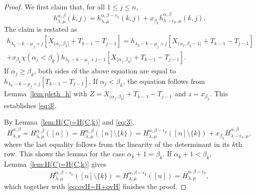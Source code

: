 \documentclass[12pt]{amsart}
\numberwithin{equation}{section}
\theoremstyle{definition}
\newcommand\ovh{\overline{h}}
\newcommand\ovH{\overline{H}}
\begin{document}
\begin{proof}
We first claim that, for all $1\le j\le n$,
  \begin{equation}
    \label{eq:3}
  h_{\lambda,\mu}^{\alpha,\beta}(k,j)
  =h_{\lambda,\mu}^{\alpha,\beta-\epsilon_k}(k,j)
  +x_{\beta_k} \ovh_{\lambda-\epsilon_k,\mu}^{\alpha,\beta}(k,j).
  \end{equation}
  The claim is restated as
  \begin{multline*}
    h_{\lambda_k-k-\mu_j+j}[X_{(\alpha_j,\beta_k]}+T_{k-1}-T_{j-1}]
    =h_{\lambda_k-k-\mu_j+j}[X_{(\alpha_j,\beta_k-1]}+T_{k-1}-T_{j-1}]\\
    +x_{\beta_k} \chi(\alpha_j<\beta_k)
    h_{\lambda_k-k-\mu_j+j-1}[X_{(\alpha_j,\beta_k]}+T_{k-1}-T_{j-1}].
  \end{multline*}
  If $\alpha_j\ge \beta_k$, both sides of the above equation are equal to
  $h_{\lambda_k-k-\mu_j+j}[T_{k-1}-T_{j-1}]$. If $\alpha_j<\beta_k$, the
  equation follows from Lemma~\ref{lem:pleth_h} with
  $Z=X_{(\alpha_j,\beta_k]}+T_{k-1}-T_{j-1}$ and $z=x_{\beta_k}$. This
  establishes \eqref{eq:3}.

By Lemma~\ref{lem:H(C)=H(C,k)} and \eqref{eq:3},
\begin{equation}\label{eq:ovH=H+ovH}
  \ovH_{\lambda,\mu}^{\alpha,\beta} = H_{\lambda,\mu}^{\alpha,\beta}([n])
  = H_{\lambda,\mu}^{\alpha,\beta}([n]\setminus\{k\})
 = H_{\lambda,\mu}^{\alpha,\beta-\epsilon_k}([n]\setminus\{k\})
  +x_{\beta_k} \ovH_{\lambda-\epsilon_k,\mu}^{\alpha,\beta},
\end{equation}
where the last equality follows from the linearity of the determinant in its
$k$th row. This shows the lemma for the case $\alpha_k+1=\beta_k$. If
$\alpha_k+1<\beta_k$, Lemma~\ref{lem:H(C)=H(C,k)} gives
\[
  H_{\lambda,\mu}^{\alpha,\beta-\epsilon_k}([n]\setminus\{k\})
  = H_{\lambda,\mu}^{\alpha,\beta-\epsilon_k}([n])
  =\ovH_{\lambda,\mu}^{\alpha,\beta-\epsilon_k},
\]
which together with \eqref{eq:ovH=H+ovH} finishes the proof.
\end{proof}
\end{document}

